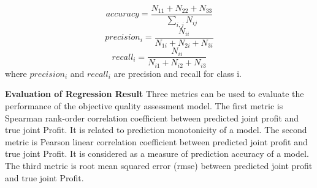 \documentclass[11pt]{article} %
\begin{document}
\begin{equation*}
accuracy = \frac{N_{11}+N_{22}+N_{33}}{\sum_{i,j}N_{ij}}
\end{equation*}
\begin{equation*}
precision_{i}=\frac{N_{ii}}{N_{1i}+N_{2i}+N_{3i}}
\end{equation*}
\begin{equation*}
recall_{i}=\frac{N_{ii}}{N_{i1}+N_{i2}+N_{i3}}
\end{equation*}
where $precision_i$ and $recall_i$ are precision and recall for class i.

\textbf{Evaluation of Regression Result}
Three metrics can be used to evaluate the performance of the objective quality assessment model. The first metric is Spearman rank-order correlation coefficient between predicted joint profit and true joint Profit. It is related to prediction monotonicity of a model. The second metric is Pearson linear correlation coefficient between predicted joint profit and true joint Profit. It is considered as a measure of prediction accuracy of a model. The third metric is root mean squared error (rmse) between predicted joint profit and true joint Profit.
\end{document}
